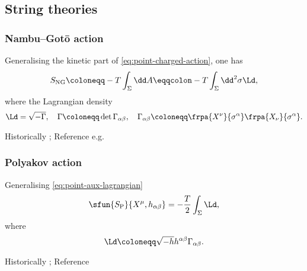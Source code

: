 \documentclass[a4paper,11pt]{article}
\begin{document}


\subsection{String theories}

\subsubsection*{Nambu--Gotō action}

Generalising the kinetic part of \eqref{eq:point-charged-action}, one has
\begin{equation}
S_\text{NG} \coloneqq -T \int_\Sigma \dd A
\eqqcolon -T \int_\Sigma\dd^2\sigma \Ld,
\end{equation}
where the Lagrangian density
\begin{equation}
\Ld = \sqrt{-\Gamma},\quad
\Gamma \coloneqq \det \Gamma_{\alpha\beta},\quad
\Gamma_{\alpha\beta} \coloneqq \frpa{X^\nu}{\sigma^\alpha} 
\frpa{X_\nu}{\sigma^\alpha}.
\end{equation}


Historically \cite{Nambu1970,Goto1971}; Reference e.g.\ 
\cite{Blumenhagen2013}
\cite[sec.\ 3.2]{Kiefer2012}

\subsubsection*{Polyakov action}

Generalising \eqref{eq:point-aux-lagrangian}
\begin{equation}
\sfun{S_\text{P}}{X^\mu, h_{\alpha\beta}} = -\frac{T}{2}\int_\Sigma \Ld,
\end{equation}
where
\begin{equation}
\Ld \coloneqq \sqrt{-h} h^{\alpha\beta}\Gamma_{\alpha\beta}.
\end{equation}



Historically \cite{Brink1976,Deser1976,Polyakov1981};
Reference
\cite[sec.\ 3.2]{Kiefer2012}
\end{document}
